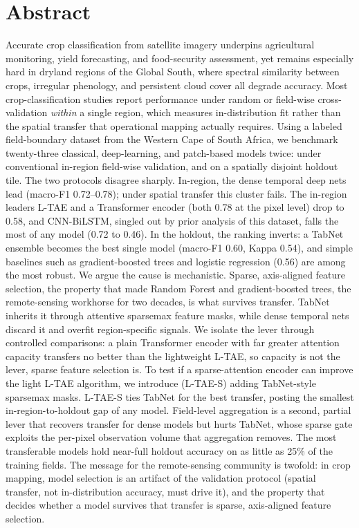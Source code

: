 \documentclass[pdflatex,sn-mathphys]{sn-jnl} %
\begin{document}
\vspace{1em}
\section*{Abstract}
\noindent
Accurate crop classification from satellite imagery underpins agricultural monitoring, yield forecasting, and food-security assessment, yet remains especially hard in dryland regions of the Global South, where spectral similarity between crops, irregular phenology, and persistent cloud cover all degrade accuracy. Most crop-classification studies report performance under random or field-wise cross-validation \emph{within} a single region, which measures in-distribution fit rather than the spatial transfer that operational mapping actually requires. Using a labeled field-boundary dataset from the Western Cape of South Africa, we benchmark twenty-three classical, deep-learning, and patch-based models twice: under conventional in-region field-wise validation, and on a spatially disjoint holdout tile. The two protocols disagree sharply. In-region, the dense temporal deep nets lead (macro-F1 0.72--0.78); under spatial transfer this cluster fails. The in-region leaders L-TAE and a Transformer encoder (both 0.78 at the pixel level) drop to 0.58, and CNN-BiLSTM, singled out by prior analysis of this dataset, falls the most of any model (0.72 to 0.46). In the holdout, the ranking inverts: a TabNet ensemble becomes the best single model (macro-F1 0.60, Kappa 0.54), and simple baselines such as gradient-boosted trees and logistic regression (0.56) are among the most robust. We argue the cause is mechanistic. Sparse, axis-aligned feature selection, the property that made Random Forest and gradient-boosted trees, the remote-sensing workhorse for two decades, is what survives transfer. TabNet inherits it through attentive sparsemax feature masks, while dense temporal nets discard it and overfit region-specific signals. We isolate the lever through controlled comparisons: a plain Transformer encoder with far greater attention capacity transfers no better than the lightweight L-TAE, so capacity is not the lever, sparse feature selection is. To test if a sparse-attention encoder can improve the light L-TAE algorithm, we introduce (L-TAE-S) adding TabNet-style sparsemax masks. L-TAE-S ties TabNet for the best transfer, posting the smallest in-region-to-holdout gap of any model. Field-level aggregation is a second, partial lever that recovers transfer for dense models but hurts TabNet, whose sparse gate exploits the per-pixel observation volume that aggregation removes. The most transferable models hold near-full holdout accuracy on as little as 25\% of the training fields. The message for the remote-sensing community is twofold: in crop mapping, model selection is an artifact of the validation protocol (spatial transfer, not in-distribution accuracy, must drive it), and the property that decides whether a model survives that transfer is sparse, axis-aligned feature selection.
\end{document}
